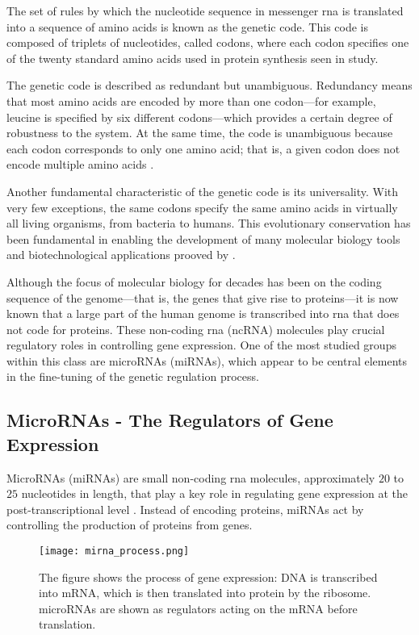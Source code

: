 The set of rules by which the nucleotide sequence in messenger \gls{rna} is
translated into a sequence of amino acids is known as the genetic code. This
code is composed of triplets of nucleotides, called codons, where each codon
specifies one of the twenty standard amino acids used in protein synthesis seen
in \textcite{genetic_codeNovozhilov2008O} study.

The genetic code is described as redundant but unambiguous. Redundancy means
that most amino acids are encoded by more than one codon—for example, leucine
is specified by six different codons—which provides a certain degree of
robustness to the system. At the same time, the code is unambiguous because
each codon corresponds to only one amino acid; that is, a given codon does not
encode multiple amino acids \cite{ConceptsBiology_DNA}.

Another fundamental characteristic of the genetic code is its universality.
With very few exceptions, the same codons specify the same amino acids in
virtually all living organisms, from bacteria to humans. This evolutionary
conservation has been fundamental in enabling the development of many molecular
biology tools and biotechnological applications prooved by
\textcite{genetic_codeKoonin2017}.

Although the focus of molecular biology for decades has been on the coding
sequence of the genome—that is, the genes that give rise to proteins—it is now
known that a large part of the human genome is transcribed into \gls{rna} that
does not code for proteins. These non-coding \gls{rna} (ncRNA) molecules play
crucial regulatory roles in controlling gene expression. One of the most
studied groups within this class are microRNAs (miRNAs), which appear to be
central elements in the fine-tuning of the genetic regulation process.

\subsection{MicroRNAs - The Regulators of Gene Expression}
MicroRNAs (miRNAs) are small non-coding \gls{rna} molecules, approximately $20$
to $25$ nucleotides in length, that play a key role in regulating gene
expression at the post-transcriptional level
\cite{regulatory_mecha_mirnaGulyaeva2016,
  first_mirna_Ambros1993,post_transcript_wightman1993}. Instead of encoding
proteins, miRNAs act by controlling the production of proteins from genes.

\begin{figure}[h]
  \centering
  \texttt{[image: mirna\_process.png]}
  \caption{The figure shows the process of gene expression: DNA is transcribed
    into mRNA, which is then translated into protein by the ribosome. microRNAs
    are shown as regulators acting on the mRNA before translation.}
  \label{fig:mirna_mechanism}
\end{figure}

